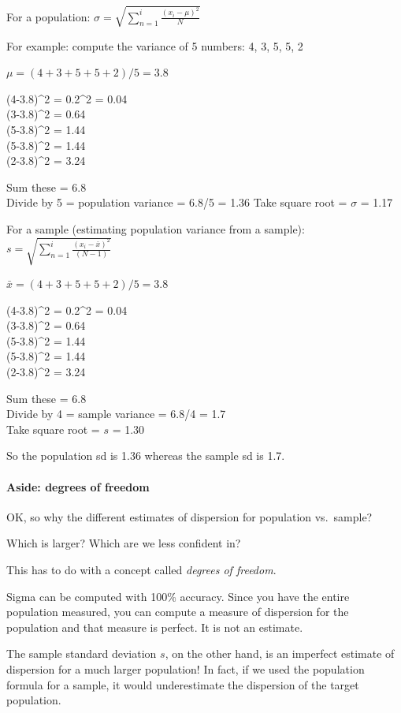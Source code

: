 \documentclass[
]{article}
\begin{document}
For a population:
\(\sigma = \sqrt{\sum_{n=1}^{i}{\frac{(x_i-\mu)^2}{N}}}\)

For example: compute the variance of 5 numbers: 4, 3, 5, 5, 2

\(\mu = (4+3+5+5+2)/5 = 3.8\)

(4-3.8)\^{}2 = 0.2\^{}2 = 0.04\\
(3-3.8)\^{}2 = 0.64\\
(5-3.8)\^{}2 = 1.44\\
(5-3.8)\^{}2 = 1.44\\
(2-3.8)\^{}2 = 3.24

Sum these = 6.8\\
Divide by 5 = population variance = 6.8/5 = 1.36 Take square root =
\(\sigma\) = 1.17

For a sample (estimating population variance from a sample):
\(s = \sqrt{\sum_{n=1}^{i}{\frac{(x_i-\bar{x})^2}{(N-1)}}}\)

\(\bar{x} = (4+3+5+5+2)/5 = 3.8\)

(4-3.8)\^{}2 = 0.2\^{}2 = 0.04\\
(3-3.8)\^{}2 = 0.64\\
(5-3.8)\^{}2 = 1.44\\
(5-3.8)\^{}2 = 1.44\\
(2-3.8)\^{}2 = 3.24

Sum these = 6.8\\
Divide by 4 = sample variance = 6.8/4 = 1.7\\
Take square root = \(s\) = 1.30

So the population sd is 1.36 whereas the sample sd is 1.7.

\hypertarget{aside-degrees-of-freedom}{%
\paragraph{Aside: degrees of freedom}\label{aside-degrees-of-freedom}}

OK, so why the different estimates of dispersion for population
vs.~sample?

Which is larger? Which are we less confident in?

This has to do with a concept called \emph{degrees of freedom}.

Sigma can be computed with 100\% accuracy. Since you have the entire
population measured, you can compute a measure of dispersion for the
population and that measure is perfect. It is not an estimate.

The sample standard deviation \(s\), on the other hand, is an imperfect
estimate of dispersion for a much larger population! In fact, if we used
the population formula for a sample, it would underestimate the
dispersion of the target population.
\end{document}
